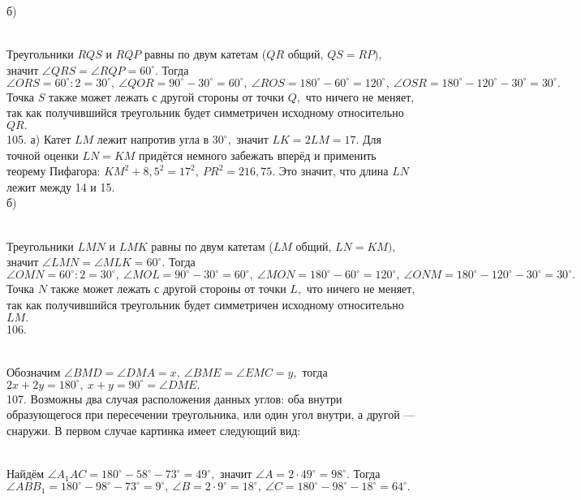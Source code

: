 б)\begin{figure}[ht!]
\end{figure}\\
Треугольники $RQS$ и $RQP$ равны по двум катетам ($QR$ общий, $QS=RP),$ значит $\angle QRS=\angle RQP=60^\circ.$ Тогда $\angle ORS=60^\circ:2=30^\circ,\ \angle QOR=90^\circ-30^\circ=60^\circ,\ \angle ROS=180^\circ-60^\circ=120^\circ,\ \angle OSR=180^\circ-120^\circ-30^\circ=30^\circ.$ Точка $S$ также может лежать с другой стороны от точки $Q,$ что ничего не меняет, так как получившийся треугольник будет симметричен исходному относительно $QR.$\\
105. а) Катет $LM$ лежит напротив угла в $30^\circ,$ значит $LK=2LM=17.$ Для точной оценки $LN=KM$ придётся немного забежать вперёд и применить теорему Пифагора: $KM^2+8,5^2=17^2,\ PR^2=216,75.$ Это значит, что длина $LN$ лежит между 14 и 15.\\
б)\begin{figure}[ht!]
\end{figure}\\
Треугольники $LMN$ и $LMK$ равны по двум катетам ($LM$ общий, $LN=KM),$ значит $\angle LMN=\angle MLK=60^\circ.$ Тогда $\angle OMN=60^\circ:2=30^\circ,\ \angle MOL=90^\circ-30^\circ=60^\circ,\ \angle MON=180^\circ-60^\circ=120^\circ,\ \angle ONM=180^\circ-120^\circ-30^\circ=30^\circ.$ Точка $N$ также может лежать с другой стороны от точки $L,$ что ничего не меняет, так как получившийся треугольник будет симметричен исходному относительно $LM.$\\
106. \begin{figure}[ht!]
\end{figure}\\
Обозначим $\angle BMD=\angle DMA=x,\ \angle BME=\angle EMC=y,$ тогда $2x+2y=180^\circ,\ x+y=90^\circ=\angle DME.$\\
107. Возможны два случая расположения данных углов: оба внутри образующегося при пересечении треугольника, или один угол внутри, а другой --- снаружи. В первом случае картинка имеет следующий вид:
\begin{figure}[ht!]
\end{figure}\\
Найдём $\angle A_1AC=180^\circ-58^\circ-73^\circ=49^\circ,$ значит $\angle A=2\cdot49^\circ=98^\circ.$ Тогда $\angle ABB_1=180^\circ-98^\circ-73^\circ=9^\circ,\ \angle B=2\cdot9^\circ=18^\circ,\ \angle C=180^\circ-98^\circ-18^\circ=64^\circ.$\\
